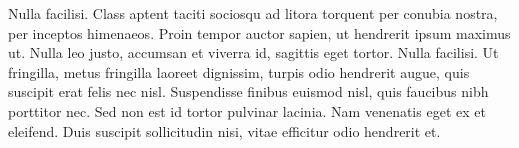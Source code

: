Nulla facilisi. Class aptent taciti sociosqu ad litora torquent per conubia nostra, per inceptos himenaeos. Proin tempor auctor sapien, ut hendrerit ipsum maximus ut. Nulla leo justo, accumsan et viverra id, sagittis eget tortor. Nulla facilisi. Ut fringilla, metus fringilla laoreet dignissim, turpis odio hendrerit augue, quis suscipit erat felis nec nisl. Suspendisse finibus euismod nisl, quis faucibus nibh porttitor nec. Sed non est id tortor pulvinar lacinia. Nam venenatis eget ex et eleifend. Duis suscipit sollicitudin nisi, vitae efficitur odio hendrerit et.\\
